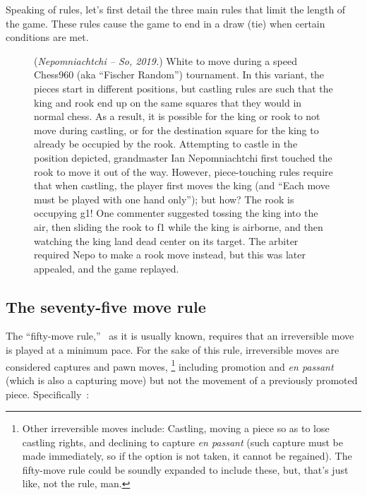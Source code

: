\documentclass[twocolumn]{article}
\begin{document}
Speaking of rules, let's first detail the three main rules that limit
the length of the game. These rules cause the game to end in a draw
(tie) when certain conditions are met.

\begin{figure}
  \begin{center}
    \chessboard[
      setfen=2nr1r1k/pb1n1pqp/1p2p1p1/1N1pN3/5P2/1P4P1/P2PPQ1P/2R1K1RB,
      pgfstyle=curvemove,markmoves={e1-g1},
      pgfstyle=straightmove,markmoves={g1-f1},
      showmover=false]
  \end{center}
  \caption{ ({\it Nepomniachtchi -- So, 2019.}) White to move during a
    speed Chess960 (aka ``Fischer Random'') tournament. In this
    variant, the pieces start in different positions, but castling
    rules are such that the king and rook end up on the same squares
    that they would in normal chess. As a result, it is possible for
    the king or rook to not move during castling, or for the
    destination square for the king to already be occupied by the
    rook. Attempting to castle in the position depicted, grandmaster
    Ian Nepomniachtchi first touched the rook to move it out of the
    way. However, piece-touching rules require that when castling, the
    player first moves the king (and ``Each move must be played with
    one hand only''); but how? The rook is occupying g1! One commenter
    suggested tossing the king into the air, then sliding the rook to
    f1 while the king is airborne, and then watching the king land
    dead center on its target. The arbiter required Nepo to make a
    rook move instead, but this was later appealed, and the game
    replayed. } \label{fig:castle960}
\end{figure}


\subsection{The seventy-five move rule} \label{sec:75}

The ``fifty-move rule,''~\cite{wikipedia50move} as it is usually
known, requires that an irreversible move is played at a minimum pace.
For the sake of this rule, irreversible moves are considered captures
and pawn moves,%
\footnote{ Other irreversible moves include: Castling, moving a piece
  so as to lose castling rights, and declining to capture {\it en
    passant} (such capture must be made immediately, so if the option
  is not taken, it cannot be regained). The fifty-move rule could be
  soundly expanded to include these, but, that's just like, not the
  rule, man.}
%
including promotion and {\it en passant} (which is also a capturing
move) but not the movement of a previously promoted piece.
Specifically~\cite{fiderules}:
\end{document}
